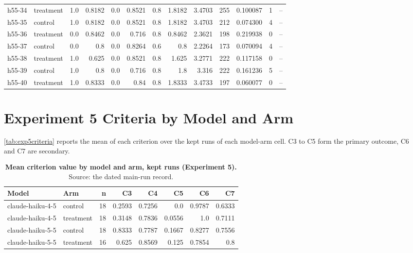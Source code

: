 \documentclass[11pt,a4paper]{article}
\begin{document}
\begin{footnotesize}
\begin{longtable}{llrrrrrrrrrrl}
h55-34 & treatment & 1.0 & 0.8182 & 0.0 & 0.8521 & 0.8 & 1.8182 & 3.4703 & 255 & 0.100087 & 1 & -- \\
h55-35 & control & 1.0 & 0.8182 & 0.0 & 0.8521 & 0.8 & 1.8182 & 3.4703 & 212 & 0.074300 & 4 & -- \\
h55-36 & treatment & 0.0 & 0.8462 & 0.0 & 0.716 & 0.8 & 0.8462 & 2.3621 & 198 & 0.219938 & 0 & -- \\
h55-37 & control & 0.0 & 0.8 & 0.0 & 0.8264 & 0.6 & 0.8 & 2.2264 & 173 & 0.070094 & 4 & -- \\
h55-38 & treatment & 1.0 & 0.625 & 0.0 & 0.8521 & 0.8 & 1.625 & 3.2771 & 222 & 0.117158 & 0 & -- \\
h55-39 & control & 1.0 & 0.8 & 0.0 & 0.716 & 0.8 & 1.8 & 3.316 & 222 & 0.161236 & 5 & -- \\
h55-40 & treatment & 1.0 & 0.8333 & 0.0 & 0.84 & 0.8 & 1.8333 & 3.4733 & 197 & 0.060077 & 0 & -- \\
\end{longtable}
\end{footnotesize}

\section{Experiment 5 Criteria by Model and Arm}
\label{app:exp5criteria}

\autoref{tab:exp5criteria} reports the mean of each criterion over the kept runs of each model-arm cell. C3 to C5 form the primary outcome, C6 and C7 are secondary.

\begin{table}[h]
\centering\small
\caption{\small \textbf{Mean criterion value by model and arm, kept runs (Experiment 5).} Source: the dated main-run record.}
\label{tab:exp5criteria}
\begin{tabular}{llrrrrrr}
\toprule
Model & Arm & n & C3 & C4 & C5 & C6 & C7 \\
\midrule
claude-haiku-4-5 & control   & 18 & 0.2593 & 0.7256 & 0.0    & 0.9787 & 0.6333 \\
claude-haiku-4-5 & treatment & 18 & 0.3148 & 0.7836 & 0.0556 & 1.0    & 0.7111 \\
claude-haiku-5-5 & control   & 18 & 0.8333 & 0.7787 & 0.1667 & 0.8277 & 0.7556 \\
claude-haiku-5-5 & treatment & 16 & 0.625  & 0.8569 & 0.125  & 0.7854 & 0.8 \\
\bottomrule
\end{tabular}
\end{table}
\end{document}
